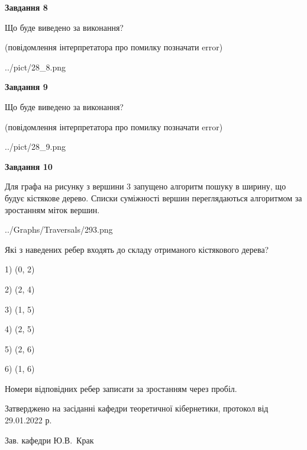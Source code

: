 \documentclass[12pt, ukrainian]{article}
\begin{document}
{\begin {large}
{\begin {center}\textbf{Завдання 8}\end {center}}\par
Що буде виведено за виконання?\par
 (повідомлення інтерпретатора про помилку позначати error)\par
\begin{center}
	{../pict/28_8.png}
\end{center}
\newpage

{\begin {center}\textbf{Завдання 9}\end {center}}\par
Що буде виведено за виконання?\par
 (повідомлення інтерпретатора про помилку позначати error)\par
\begin{center}
	{../pict/28_9.png}
\end{center}
\newpage

{\begin {center}\textbf{Завдання 10}\end {center}}\par
Для графа на рисунку з вершини 3 запущено алгоритм пошуку в ширину, що будує кістякове дерево. Списки суміжності вершин переглядаються алгоритмом за зростанням міток вершин.\par
\begin{center}
	{../Graphs/Traversals/293.png}
\end{center}
\par Які з наведених ребер входять до складу отриманого кістякового дерева?\par
1) (0, 2)\par
2) (2, 4)\par
3) (1, 5)\par
4) (2, 5)\par
5) (2, 6)\par
6) (1, 6)\par
{\vskip 15pt} Номери відповідних ребер записати за зростанням через пробіл.\par
\newpage


\end {large}
}
{\smallskip \begin {small} Затверджено на засіданні кафедри теоретичної кібернетики, протокол  від   29.01.2022 р.\par\smallskip\smallskip
{\parbox {6.5 cm}{Зав. кафедри \dotfill Ю.В.~Крак}} \end{small}}
\end{document}
